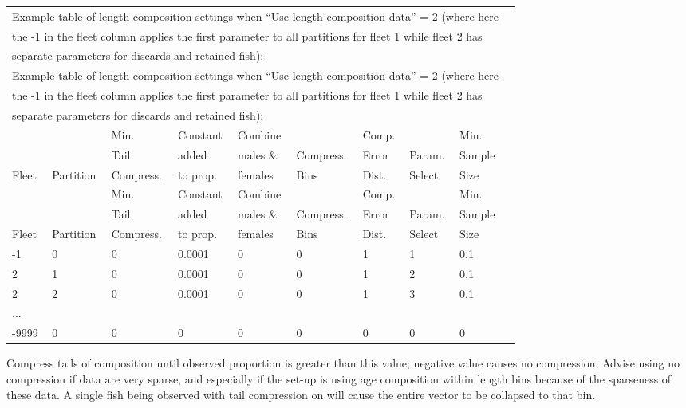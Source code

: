 \begin{tabular}{p{1cm} p{1.5cm} p{1.5cm} p{1.5cm} p{1.5cm} p{1.5cm} p{1.5cm} p{1.5cm} p{1.5cm} p{1.5cm}}
		\multicolumn{9}{l}{Example table of length composition settings when ``Use length composition data'' = 2 (where here} \\
		\multicolumn{9}{l}{the -1 in the fleet column applies the first parameter to all partitions for fleet 1 while fleet 2 has} \\
		\multicolumn{9}{l}{separate parameters for discards and retained fish):} \\
		\multicolumn{9}{l}{Example table of length composition settings when ``Use length composition data'' = 2 (where here} \\
		\multicolumn{9}{l}{the -1 in the fleet column applies the first parameter to all partitions for fleet 1 while fleet 2 has} \\
		\multicolumn{9}{l}{separate parameters for discards and retained fish):} \\
		\hline
		          &           & Min.      & Constant & Combine   &           & Comp. &           & Min. \Tstrut\\
		          &           & Tail      & added    & males \&  & Compress. & Error & Param.    & Sample \\
		Fleet     & Partition & Compress. & to prop. & females   & Bins      & Dist. & Select    & Size \Bstrut\\
		          &           & Min.      & Constant & Combine   &           & Comp. &           & Min. \Tstrut\\
		          &           & Tail      & added    & males \&  & Compress. & Error & Param.    & Sample \\
		Fleet     & Partition & Compress. & to prop. & females   & Bins      & Dist. & Select    & Size \Bstrut\\
		\hline
		-1 & 0 & 0 & 0.0001 & 0 & 0 & 1 & 1 & 0.1 \Tstrut\\
		2 & 1 & 0 & 0.0001 & 0 & 0 & 1 & 2 & 0.1 \\
		2 & 2 & 0 & 0.0001 & 0 & 0 & 1 & 3 & 0.1 \\
		... &  &  &        &   &   &   &   &  \\
		-9999 & 0 & 0 & 0 & 0 & 0 & 0 & 0 & 0 \Bstrut\\
		\hline
\end{tabular}


Compress tails of composition until observed proportion is greater than this value; negative value causes no compression; Advise using no compression if data are very sparse, and especially if the set-up is using age composition within length bins because of the sparseness of these data. A single fish being observed with tail compression on will cause the entire vector to be collapsed to that bin.

